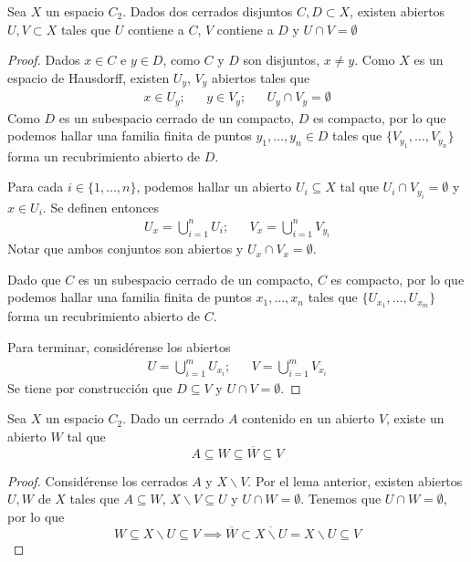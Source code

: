 \begin{lemma}
Sea $X$ un espacio $C_2$. Dados dos cerrados disjuntos $C,D \subset X$,
existen abiertos $U,V \subset X$ tales que $U$ contiene a $C$, $V$ contiene
a $D$ y $U\cap V=\emptyset$
\end{lemma}

\begin{proof}
Dados $x \in C$ e $y \in D$, como $C$ y $D$ son disjuntos, $x \neq y$. Como
$X$ es un espacio de Hausdorff, existen $U_y$, $V_y$ abiertos tales que
\begin{align*}
x \in U_y; && y \in V_y; && U_y\cap V_y=\emptyset
\end{align*}
Como $D$ es un subespacio cerrado de un compacto, $D$ es compacto, por lo
que podemos hallar una familia finita de puntos $y_1,\dots,y_n \in D$ tales
que $\{V_{y_1},\dots, V_{y_n}\}$ forma un recubrimiento abierto de $D$.

Para cada $i \in \{1,\dots,n\}$, podemos hallar un abierto $U_i \subseteq X$
tal que $U_i\cap V_{y_i}=\emptyset$ y $x \in U_i$. Se  definen entonces
\begin{align*}
U_x=\bigcup_{i=1}^nU_i;&&  V_x=\bigcup_{i=1}^n V_{y_i}
\end{align*}
Notar que ambos conjuntos son abiertos y $U_x\cap V_x=\emptyset$.

Dado que $C$ es un subespacio cerrado de un compacto, $C$ es compacto, por
lo que podemos hallar una familia finita de puntos $x_1,\dots,x_n$ tales que
$\{U_{x_1},\dots,U_{x_m}\}$ forma un recubrimiento abierto de $C$.

Para terminar, considérense los abiertos
\begin{align*}
U=\bigcup _{i=1}^m U_{x_i};&&  V=\bigcup_{i=1}^m V_{x_i}
\end{align*}
Se tiene por construcción que $D \subseteq V$ y $U\cap V=\emptyset$.
\end{proof}

\begin{lemma}
Sea $X$ un espacio $C_2$. Dado un cerrado $A$ contenido en un abierto $V$,
existe un abierto $W$ tal que
$$A \subseteq W \subseteq \overline{W} \subseteq V$$
\end{lemma}

\begin{proof}
Considérense los cerrados $A$ y $X\backslash V$. Por el lema anterior, existen
abiertos $U,W$ de $X$ tales que $A \subseteq W$, $X\backslash V \subseteq U$ y
$U\cap W=\emptyset$. Tenemos que $U\cap W=\emptyset$, por lo que
\[W \subseteq X\backslash U \subseteq V \implies
\overline{W} \subset \overline{X\backslash U}=X\backslash U \subseteq V\]
\end{proof}

